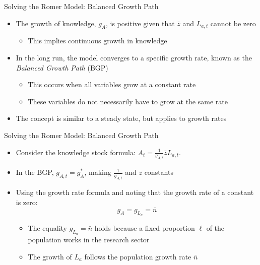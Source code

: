 \documentclass[aspectratio=1610]{beamer}
\begin{document}
\begin{frame}[wide]{Solving the Romer Model: Balanced Growth Path}
	\begin{itemize}
		\item The growth of knowledge, \(g_A\), is positive given that \(\bar{z}\) and \(L_{a,t}\) cannot be zero
		\vspace{2mm}
		\begin{itemize}
			\item This implies continuous growth in knowledge
		\end{itemize}
		\vspace{1mm}
		\item In the long run, the model converges to a specific growth rate, known as the \textit{Balanced Growth Path} (BGP)
		\vspace{2mm}
		\begin{itemize}
			\item This occurs when all variables grow at a constant rate
			\item These variables do not necessarily have to grow at the same rate
		\end{itemize}
		\item The concept is similar to a steady state, but applies to growth rates
	\end{itemize}
\end{frame}

\begin{frame}[wide]{Solving the Romer Model: Balanced Growth Path}
	\begin{itemize}
		\item Consider the knowledge stock formula: \(A_t = \frac{1}{g_{A,t}} \bar{z} L_{a,t}\).
		\item In the BGP, \(g_{A,t} = g_A^*\), making \(\frac{1}{g_{A,t}}\) and \(\bar{z}\) constants
		\item Using the growth rate formula and noting that the growth rate of a constant is zero:
		\[
		g_A = g_{L_a} = \bar{n}
		\]
		\begin{itemize}
			\item The equality \(g_{L_a} = \bar{n}\) holds because a fixed proportion \(\ell\) of the population works in the research sector
			\item The growth of \(L_a\) follows the population growth rate $\bar{n}$
		\end{itemize}
	\end{itemize}
\end{frame}
\end{document}
